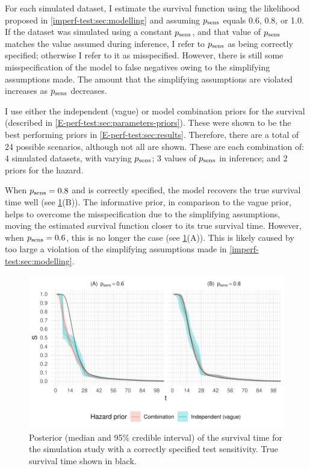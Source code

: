 \documentclass[thesis.tex]{subfiles}
\begin{document}
For each simulated dataset, I estimate the survival function using the likelihood proposed in \cref{imperf-test:sec:modelling} and assuming $p_\text{sens}$ equals 0.6, 0.8, or 1.0.
If the dataset was simulated using a constant $p_\text{sens}$, and that value of $p_\text{sens}$ matches the value assumed during inference, I refer to $p_\text{sens}$ as being correctly specified; otherwise I refer to it as misspecified.
However, there is still some misspecification of the model to false negatives owing to the simplifying assumptions made.
The amount that the simplifying assumptions are violated increases as $p_\text{sens}$ decreases.

I use either the independent (vague) or model combination priors for the survival (described in \cref{E-perf-test:sec:parameters-priors}).
These were shown to be the best performing priors in \cref{E-perf-test:sec:results}.
Therefore, there are a total of 24 possible scenarios, although not all are shown.
These are each combination of: 4 simulated datasets, with varying $p_\text{sens}$; 3 values of $p_\text{sens}$ in inference; and 2 priors for the hazard.

When $p_\text{sens} = 0.8$ and is correctly specified, the model recovers the true survival time well (see \cref{imperf-test:fig:constant-test-sensitivity}(B)).
The informative prior, in comparison to the vague prior, helps to overcome the misspecification due to the simplifying assumptions, moving the estimated survival function closer to its true survival time.
However, when $p_\text{sens} = 0.6$, this is no longer the case (see \cref{imperf-test:fig:constant-test-sensitivity}(A)).
This is likely caused by too large a violation of the simplifying assumptions made in \cref{imperf-test:sec:modelling}.
\begin{figure}
  \includegraphics[width=\textwidth]{cis-imperfect-testing/sim-constant-sensitivity}
  \caption[Simulation study results with constant test sensitivity]{%
    Posterior (median and 95\% credible interval) of the survival time for the simulation study with a correctly specified test sensitivity.
    True survival time shown in black.
  }
  \label{imperf-test:fig:constant-test-sensitivity}
\end{figure}
\end{document}
